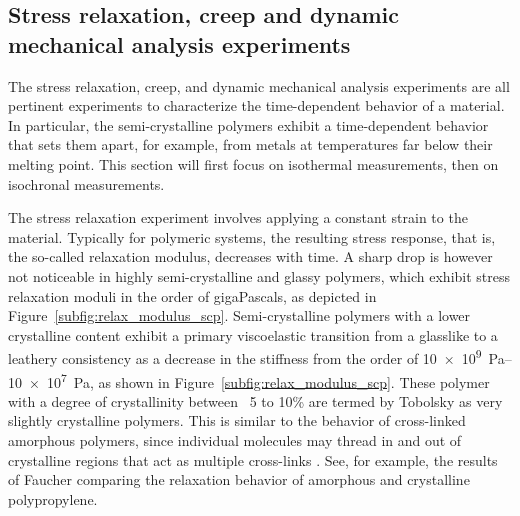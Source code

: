\subsection{Stress relaxation, creep  and dynamic mechanical analysis experiments}
\label{sec:relax_creep_dma}

The stress relaxation, creep, and dynamic mechanical analysis experiments are all pertinent experiments to characterize the time-dependent behavior of a material.
In particular, the semi-crystalline polymers exhibit a time-dependent behavior that sets them apart, for example, from metals at temperatures far below their melting point.
This section will first focus on isothermal measurements, then on isochronal measurements.

The stress relaxation experiment involves applying a constant strain to the material.
Typically for polymeric systems, the resulting stress response, that is, the so-called relaxation modulus, decreases with time.
A sharp drop is however not noticeable in highly semi-crystalline and glassy polymers, which exhibit stress relaxation moduli in the order of gigaPascals, as depicted in Figure~\ref{subfig:relax_modulus_scp}.
Semi-crystalline polymers with a lower crystalline content exhibit a primary viscoelastic transition from a glasslike to a leathery consistency as a decrease in the stiffness from the order of \SIrange{10e9}{10e7}{\pascal}, as shown in Figure~\ref{subfig:relax_modulus_scp}.
These polymer with a degree of crystallinity between ~5 to 10\% are termed by Tobolsky \citep{tobolskyPropertiesStructurePolymers1960} as very slightly crystalline polymers.
This is similar to the behavior of cross-linked amorphous polymers, since individual molecules may thread in and out of crystalline regions that act as multiple cross-links \citep{ferryViscoelasticPropertiesPolymers1980, gsellYieldTransientEffects1981}.
See, for example, the results of Faucher \citep{faucherViscoelasticBehaviorPolyethylene1959} comparing the relaxation behavior of amorphous and crystalline polypropylene.


